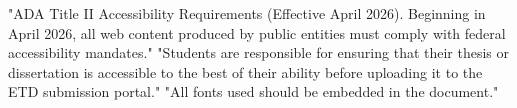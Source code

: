 \thesisrequiretagging
{}
	{"ADA Title II Accessibility Requirements (Effective April 2026).
	 Beginning in April 2026, all web content produced by public entities must
	 comply with federal accessibility mandates."}
	{"Students are responsible for ensuring that their thesis or dissertation is
	 accessible to the best of their ability before uploading it to the ETD
	 submission portal."}
	{"All fonts used should be embedded in the document."}

